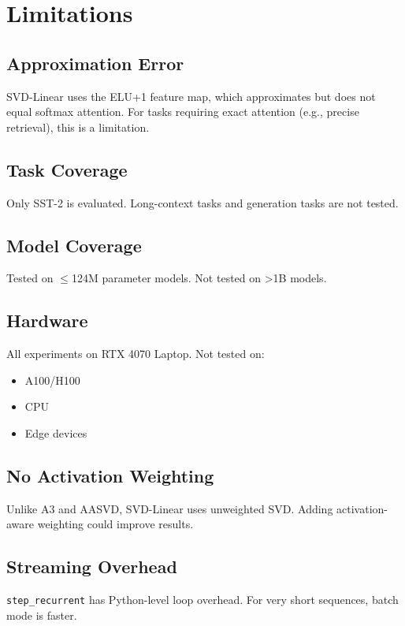 
\section{Limitations}

\subsection{Approximation Error}

SVD-Linear uses the ELU+1 feature map, which approximates but does not equal 
softmax attention. For tasks requiring exact attention (e.g., precise 
retrieval), this is a limitation.

\subsection{Task Coverage}

Only SST-2 is evaluated. Long-context tasks and generation tasks are not 
tested.

\subsection{Model Coverage}

Tested on $\le$124M parameter models. Not tested on \textgreater{}1B models.

\subsection{Hardware}

All experiments on RTX 4070 Laptop. Not tested on:
\begin{itemize}
\item A100/H100
\item CPU
\item Edge devices

\end{itemize}
\subsection{No Activation Weighting}

Unlike A3 and AASVD, SVD-Linear uses unweighted SVD. Adding activation-aware 
weighting could improve results.

\subsection{Streaming Overhead}

\texttt{step\_recurrent} has Python-level loop overhead. For very short sequences, 
batch mode is faster.

